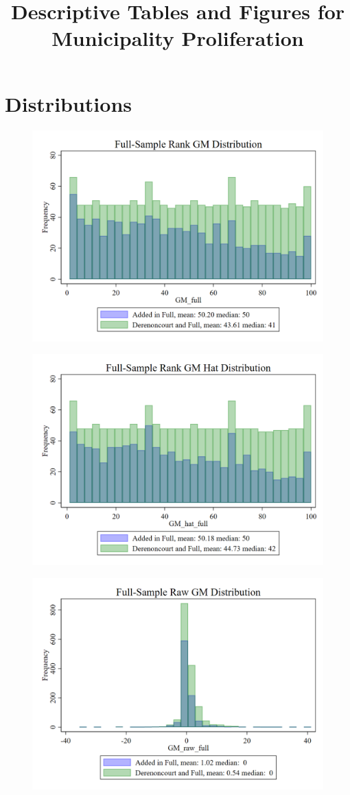 \documentclass{article}
\title{Descriptive Tables and Figures for Municipality Proliferation}
\begin{document}
\maketitle
\tableofcontents
{\footnotesize 
\listoffigures
\listoftables}
\clearpage

\section{Distributions}
\begin{figure}
	\centering
	\includegraphics[width=.8\textwidth]{figures/distributions/GM_full.png}
\end{figure}
\clearpage
\begin{figure}
	\centering
	\includegraphics[width=.8\textwidth]{figures/distributions/GM_hat_full.png}
\end{figure}
\clearpage
\begin{figure}
	\centering
	\includegraphics[width=.8\textwidth]{figures/distributions/GM_raw_full.png}
\end{figure}
\end{document}
